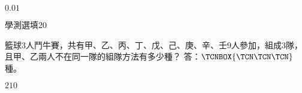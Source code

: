 \begin{QUESTIONS}
\begin{QUESTION}
\begin{QBODY}
        \end{QBODY}
        \begin{QFROMS}
        \end{QFROMS}
        \begin{QTAGS}\end{QTAGS}
        \begin{QANS}
            $0.01$
        \end{QANS}
        \begin{QSOLLIST}
        \end{QSOLLIST}
        \begin{QEMPTYSPACE}
        \end{QEMPTYSPACE}
    \end{QUESTION}
    \begin{QUESTION}
        \begin{ExamInfo}{90}{學測}{選填}{20}
        \end{ExamInfo}
        \begin{ExamAnsRateInfo}{}{}{}{}
        \end{ExamAnsRateInfo}
        \begin{QBODY}
			籃球3人鬥牛賽，共有甲、乙、丙、丁、戊、己、庚、辛、壬9人參加，組成3隊，且甲、乙兩人不在同一隊的組隊方法有多少種？
	答：$\TCNBOX{\TCN\TCN\TCN}$種。
        \end{QBODY}
        \begin{QFROMS}
        \end{QFROMS}
        \begin{QTAGS}\end{QTAGS}
        \begin{QANS}
            $210$
        \end{QANS}
        \begin{QSOLLIST}
        \end{QSOLLIST}
        \begin{QEMPTYSPACE}
        \end{QEMPTYSPACE}
    \end{QUESTION}
\end{QUESTIONS}